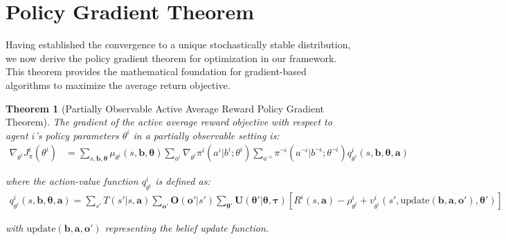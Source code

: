 \documentclass[a4paper,12pt]{report}
\newtheorem{theorem}{Theorem}
\begin{document}
\section{Policy Gradient Theorem}
Having established the convergence to a unique stochastically stable distribution,
we now derive the policy gradient theorem for optimization in our framework. This
theorem provides the mathematical foundation for gradient-based algorithms to maximize
the average return objective.
\label{appendix:avg_gradient}
\begin{theorem}[Partially Observable Active Average Reward Policy Gradient
        Theorem]
    The gradient of the active average reward objective
    with respect to agent $i$'s policy parameters $\theta^{i}$ in a partially observable
    setting is:
    \begin{align}
        \nabla_{\theta^i}J^{i}_{\pi}(\theta^{i}) & = \sum_{s, \boldsymbol{b}, \boldsymbol{\theta}}\mu_{\theta^i}(s, \boldsymbol{b}, \boldsymbol{\theta}) \sum_{a^i}\nabla_{\theta^i}\pi^{i}(a^{i}|b^{i}; \theta^{i}) \sum_{a^{\neg i}}\pi^{\neg i}(a^{\neg i}|b^{\neg i}; \theta^{\neg i}) q^{i}_{\theta^i}(s, \boldsymbol{b}, \boldsymbol{\theta}, \boldsymbol{a})
    \end{align}

    where the action-value function $q^{i}_{\theta^i}$ is defined as:
    \begin{align}
        q^{i}_{\theta^i}(s, \boldsymbol{b}, \boldsymbol{\theta}, \boldsymbol{a}) = \sum_{s'}T(s'|s, \boldsymbol{a}) \sum_{\boldsymbol{o}'}\boldsymbol{O}(\boldsymbol{o}'|s') \sum_{\boldsymbol{\theta}'}\boldsymbol{U}(\boldsymbol{\theta}'|\boldsymbol{\theta}, \boldsymbol{\tau}) \left[ R^{i}(s, \boldsymbol{a}) - \rho^{i}_{\theta^i}+ v^{i}_{\theta^i}(s', \text{update}(\boldsymbol{b}, \boldsymbol{a}, \boldsymbol{o}'), \boldsymbol{\theta}') \right]
    \end{align}

    with $\text{update}(\boldsymbol{b}, \boldsymbol{a}, \boldsymbol{o}')$ representing
    the belief update function.
\end{theorem}
\end{document}
